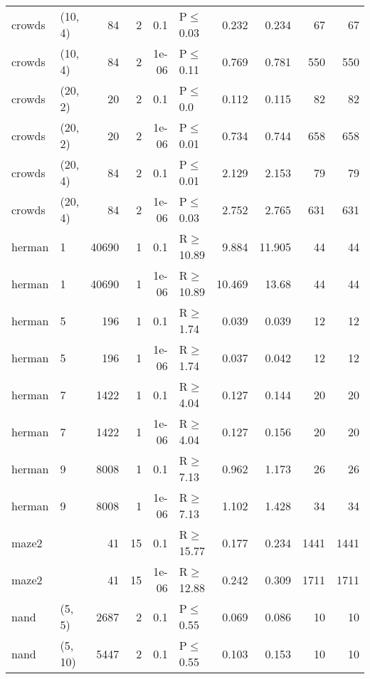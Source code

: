 \begin{longtable}{llrrrlrrrr}
 crowds        & (10, 4)   &     	84 &   2 & 0.1   & P$\leq$0.03  & 0.232  & 0.234  & 67      & 67      \\
 crowds        & (10, 4)   &     	84 &   2 & 1e-06 & P$\leq$0.11  & 0.769  & 0.781  & 550     & 550     \\
 crowds        & (20, 2)   &     	20 &   2 & 0.1   & P$\leq$0.0   & 0.112  & 0.115  & 82      & 82      \\
 crowds        & (20, 2)   &     	20 &   2 & 1e-06 & P$\leq$0.01  & 0.734  & 0.744  & 658     & 658     \\
 crowds        & (20, 4)   &     	84 &   2 & 0.1   & P$\leq$0.01  & 2.129  & 2.153  & 79      & 79      \\
 crowds        & (20, 4)   &     	84 &   2 & 1e-06 & P$\leq$0.03  & 2.752  & 2.765  & 631     & 631     \\
 herman        & 1         &  	40690 &   1 & 0.1   & R$\geq$10.89 & 9.884  & 11.905 & 44      & 44      \\
 herman        & 1         &  	40690 &   1 & 1e-06 & R$\geq$10.89 & 10.469 & 13.68  & 44      & 44      \\
 herman        & 5         &    	196 &   1 & 0.1   & R$\geq$1.74  & 0.039  & 0.039  & 12      & 12      \\
 herman        & 5         &    	196 &   1 & 1e-06 & R$\geq$1.74  & 0.037  & 0.042  & 12      & 12      \\
 herman        & 7         &   	1422 &   1 & 0.1   & R$\geq$4.04  & 0.127  & 0.144  & 20      & 20      \\
 herman        & 7         &   	1422 &   1 & 1e-06 & R$\geq$4.04  & 0.127  & 0.156  & 20      & 20      \\
 herman        & 9         &   	8008 &   1 & 0.1   & R$\geq$7.13  & 0.962  & 1.173  & 26      & 26      \\
 herman        & 9         &   	8008 &   1 & 1e-06 & R$\geq$7.13  & 1.102  & 1.428  & 34      & 34      \\
 maze2         &           &     	41 &  15 & 0.1   & R$\geq$15.77 & 0.177  & 0.234  & 1441    & 1441    \\
 maze2         &           &     	41 &  15 & 1e-06 & R$\geq$12.88 & 0.242  & 0.309  & 1711    & 1711    \\
 nand          & (5, 5)    &   	2687 &   2 & 0.1   & P$\leq$0.55  & 0.069  & 0.086  & 10      & 10      \\
 nand          & (5, 10)   &   	5447 &   2 & 0.1   & P$\leq$0.55  & 0.103  & 0.153  & 10      & 10      \\

\end{longtable}
